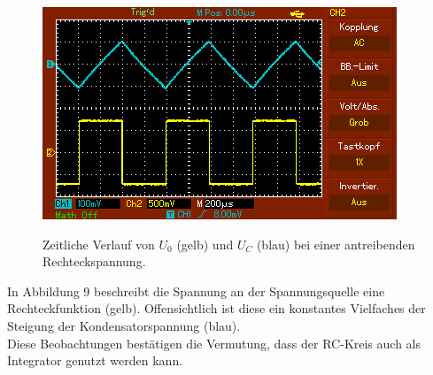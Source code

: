 	 \begin{figure}[H]
	 	\centering
	 	\caption{Zeitliche Verlauf von $U_0$ (gelb) und $U_C$ (blau) bei einer antreibenden Rechteckspannung.}
	 	\includegraphics[width=\linewidth-70pt,height=\textheight-70pt,keepaspectratio]{content/MAP004.png}
	 	\label{fig:Rechteck}
	 \end{figure}
	 In Abbildung 9 beschreibt die Spannung an der Spannungsquelle eine Rechteckfunktion (gelb). Offensichtlich ist diese ein konstantes Vielfaches der Steigung der Kondensatorspannung (blau).\\

	 Diese Beobachtungen bestätigen die Vermutung, dass der RC-Kreis auch als Integrator genutzt werden kann.
